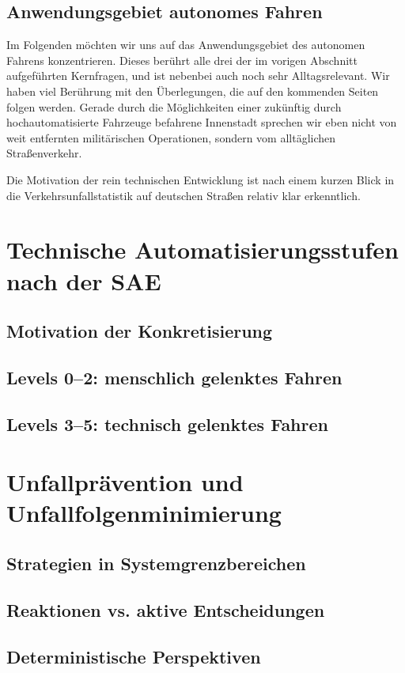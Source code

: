 \documentclass[twocolumn, german]{tum-article}
\begin{document}
\subsection{Anwendungsgebiet autonomes Fahren}
Im Folgenden möchten wir uns auf das Anwendungsgebiet des autonomen Fahrens konzentrieren. Dieses berührt alle drei der im vorigen Abschnitt aufgeführten Kernfragen, und ist nebenbei auch noch sehr Alltagsrelevant. Wir haben viel Berührung mit den Überlegungen, die auf den kommenden Seiten folgen werden. Gerade durch die Möglichkeiten einer zukünftig durch hochautomatisierte Fahrzeuge befahrene Innenstadt sprechen wir eben nicht von weit entfernten militärischen Operationen, sondern vom alltäglichen Straßenverkehr.

Die Motivation der rein technischen Entwicklung ist nach einem kurzen Blick in die Verkehrsunfallstatistik auf deutschen Straßen relativ klar erkenntlich.


\section{Technische Automatisierungsstufen nach der SAE}
\subsection{Motivation der Konkretisierung}
\subsection{Levels 0--2: menschlich gelenktes Fahren}
\subsection{Levels 3--5: technisch gelenktes Fahren}

\section{Unfallprävention und Unfallfolgenminimierung}
\subsection{Strategien in Systemgrenzbereichen}
\subsection{Reaktionen vs. aktive Entscheidungen}
\subsection{Deterministische Perspektiven}
\end{document}
